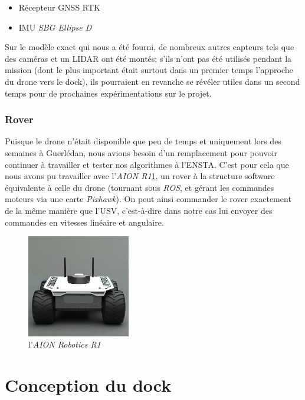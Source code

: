 \documentclass[12pt]{report}
\begin{document}
\begin{itemize}
    \item Récepteur GNSS RTK
    \item IMU \textit{SBG Ellipse D}
\end{itemize}

Sur le modèle exact qui nous a été fourni, de nombreux autres capteurs tels que des caméras et un LIDAR ont été montés; s'ils n'ont pas été utilisés pendant la mission (dont le plus important était surtout dans un premier temps l'approche du drone vers le dock), ils pourraient en revanche se révéler utiles dans un second temps pour de prochaines expérimentations sur le projet.
\subsection{Rover}

Puisque le drone n'était disponible que peu de temps et uniquement lors des semaines à Guerlédan, nous avions besoin d'un remplacement pour pouvoir continuer à travailler et tester nos algorithmes à l'ENSTA. C'est pour cela que nous avons pu travailler avec l'\textit{AION R1}\ref{fig:rover}, un rover à la structure software équivalente à celle du drone (tournant sous \textit{ROS}, et gérant les commandes moteurs via une carte \textit{Pixhawk}). On peut ainsi commander le rover exactement de la même manière que l'USV, c'est-à-dire dans notre cas lui envoyer des commandes en vitesses linéaire et angulaire.

\begin{figure}[H]
    \centering
    \includegraphics[width=0.4\textwidth]{imgs/rover.jpg}
    \caption{l'\textit{AION Robotics R1}}
    \label{fig:rover}
\end{figure}

\chapter{Conception du dock}
\end{document}
